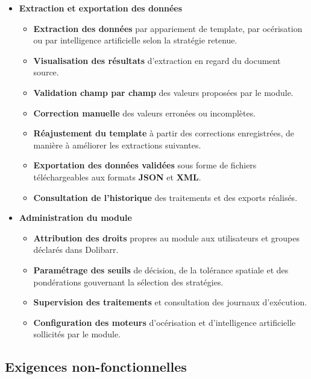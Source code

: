 \begin{itemize}
    \item[\opplume] \textbf{Extraction et exportation des données}
    \begin{itemize}
        \item[\opmanicule] \textbf{Extraction des données} par appariement de template, par
        océrisation ou par intelligence artificielle selon la stratégie retenue.
        \item[\opmanicule] \textbf{Visualisation des résultats} d'extraction en regard du
        document source.
        \item[\opmanicule] \textbf{Validation champ par champ} des valeurs proposées par le
        module.
        \item[\opmanicule] \textbf{Correction manuelle} des valeurs erronées ou incomplètes.
        \item[\opmanicule] \textbf{Réajustement du template} à partir des corrections
        enregistrées, de manière à améliorer les extractions suivantes.
        \item[\opmanicule] \textbf{Exportation des données validées} sous forme de fichiers
        téléchargeables aux formats \textbf{JSON} et \textbf{XML}.
        \item[\opmanicule] \textbf{Consultation de l'historique} des traitements et des
        exports réalisés.
    \end{itemize}

    \item[\opplume] \textbf{Administration du module}
    \begin{itemize}
        \item[\opmanicule] \textbf{Attribution des droits} propres au module aux utilisateurs
        et groupes déclarés dans Dolibarr.
        \item[\opmanicule] \textbf{Paramétrage des seuils} de décision, de la tolérance
        spatiale et des pondérations gouvernant la sélection des stratégies.
        \item[\opmanicule] \textbf{Supervision des traitements} et consultation des journaux
        d'exécution.
        \item[\opmanicule] \textbf{Configuration des moteurs} d'océrisation et d'intelligence
        artificielle sollicités par le module.
    \end{itemize}
\end{itemize}

\subsection{Exigences non-fonctionnelles}
\label{subsec:besoins-non-fonctionnels}

